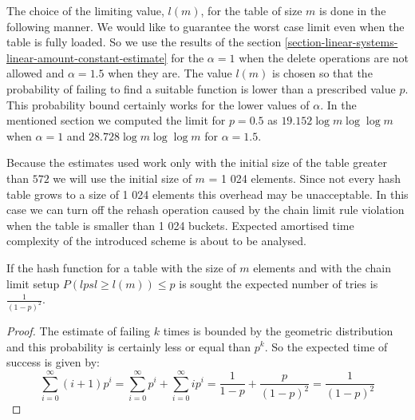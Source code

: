 The choice of the limiting value, $l(m)$, for the table of size $m$ is done in the following manner. We would like to guarantee the worst case limit even when the table is fully loaded. So we use the results of the section \ref{section-linear-systems-linear-amount-constant-estimate} for the $\alpha = 1$ when the delete operations are not allowed and $\alpha = 1.5$ when they are. The value $l(m)$ is chosen so that the probability of failing to find a suitable function is lower than a prescribed value $p$. This probability bound certainly works for the lower values of $\alpha$. In the mentioned section we computed the limit for $p = 0.5$ as $19.152 \log m \log \log m$ when $\alpha = 1$ and $28.728 \log m \log \log m$ for $\alpha = 1.5$.

Because the estimates used work only with the initial size of the table greater than $572$ we will use the initial size of $m$ = 1 024 elements. Since not every hash table grows to a size of 1 024 elements this overhead may be unacceptable. In this case we can turn off the rehash operation caused by the chain limit rule violation when the table is smaller than 1 024 buckets. Expected amortised time complexity of the introduced scheme is about to be analysed.

\begin{lemma}
\label{lemma-linear-transformations-tries}
If the hash function for a table with the size of $m$ elements and with the chain limit setup $P(lpsl \geq l(m)) \leq p$ is sought the expected number of tries is $\frac{1}{(1 - p)^2}$.
\end{lemma}
\begin{proof}
The estimate of failing $k$ times is bounded by the geometric distribution and this probability is certainly less or equal than $p^k$. So the expected time of success is given by:
\begin{displaymath}
\sum_{i = 0}^{\infty} (i + 1)p^i = \sum_{i = 0}^{\infty}p^i + \sum_{i = 0}^{\infty}ip^i = \frac{1}{1 - p} + \frac{p}{(1- p)^2} = \frac{1}{(1 - p)^2}
\end{displaymath}
\end{proof}

